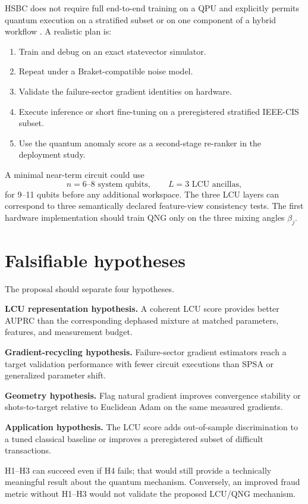 \documentclass[11pt,a4paper]{article}
\begin{document}
HSBC does not require full end-to-end training on a QPU and explicitly permits quantum execution on a stratified subset or on one component of a hybrid workflow \cite{HSBC2026}. A realistic plan is:
\begin{enumerate}[leftmargin=*]
\item Train and debug on an exact statevector simulator.
\item Repeat under a Braket-compatible noise model.
\item Validate the failure-sector gradient identities on hardware.
\item Execute inference or short fine-tuning on a preregistered stratified IEEE-CIS subset.
\item Use the quantum anomaly score as a second-stage re-ranker in the deployment study.
\end{enumerate}
A minimal near-term circuit could use
\begin{equation}
    n=6\text{--}8\text{ system qubits},\qquad
    L=3\text{ LCU ancillas},
\end{equation}
for 9--11 qubits before any additional workspace. The three LCU layers can correspond to three semantically declared feature-view consistency tests. The first hardware implementation should train QNG only on the three mixing angles $\beta_j$.

\section{Falsifiable hypotheses}

The proposal should separate four hypotheses.

\begin{description}[leftmargin=1.5cm]
\item[H1:] \textbf{LCU representation hypothesis.} A coherent LCU score provides better AUPRC than the corresponding dephased mixture at matched parameters, features, and measurement budget.
\item[H2:] \textbf{Gradient-recycling hypothesis.} Failure-sector gradient estimators reach a target validation performance with fewer circuit executions than SPSA or generalized parameter shift.
\item[H3:] \textbf{Geometry hypothesis.} Flag natural gradient improves convergence stability or shots-to-target relative to Euclidean Adam on the same measured gradients.
\item[H4:] \textbf{Application hypothesis.} The LCU score adds out-of-sample discrimination to a tuned classical baseline or improves a preregistered subset of difficult transactions.
\end{description}
H1--H3 can succeed even if H4 fails; that would still provide a technically meaningful result about the quantum mechanism. Conversely, an improved fraud metric without H1--H3 would not validate the proposed LCU/QNG mechanism.
\end{document}
